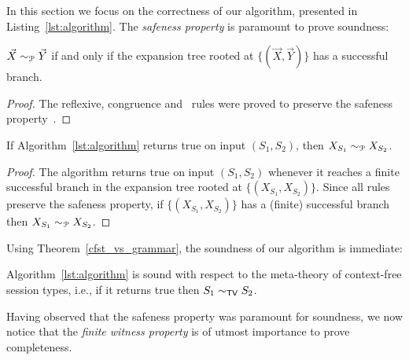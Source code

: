 In this section we focus on the correctness of our algorithm, 
presented in Listing~\ref{lst:algorithm}. 
The \emph{safeness property} is paramount to prove soundness:

\begin{proposition} 
\label{prop:safeness}
	$\vec X \sim_{\mathcal{P}} \vec Y$ if and only if the expansion tree rooted 
	at $\{(\vec X, \vec Y)\}$ has a successful branch.
\end{proposition}

\begin{proof}
	The reflexive, congruence and \BPA\ rules were proved to 
	preserve the safeness property~\cite{janvcar1999techniques}.
\end{proof}

\begin{theorem}
	If Algorithm~\ref{lst:algorithm} returns \textsf{true} on input 
	$(S_1,S_2)$, then $X_{S_1} \sim_{\mathcal{P}} X_{S_2}$.
\end{theorem}

\begin{proof}
	The algorithm returns \textsf{true} on input $(S_1,S_2)$ whenever 
	it reaches a finite successful branch in the expansion tree rooted 
	at $\{(X_{S_1}, X_{S_2})\}$. Since all rules preserve the safeness 
	property, if $\{(X_{S_1}, X_{S_2})\}$ has a (finite) successful 
	branch then $X_{S_1} \sim_{\mathcal{P}} X_{S_2}$.
\end{proof}

Using Theorem~\ref{cfst_vs_grammar}, the soundness of our algorithm is 
immediate:

\begin{theorem}
	Algorithm~\ref{lst:algorithm} is sound with respect to the meta-theory 
	of context-free session types, i.e., if it returns \textsf{true} then $S_1 \sim_{\mathsf{TV}} S_2$.
\end{theorem}

Having observed that the safeness property was paramount for soundness, 
we now notice that the \emph{finite witness property} is of utmost 
importance to prove completeness.

